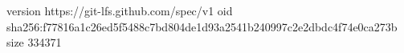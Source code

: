 version https://git-lfs.github.com/spec/v1
oid sha256:f77816a1c26ed5f5488c7bd804de1d93a2541b240997c2e2dbdc4f74e0ca273b
size 334371
